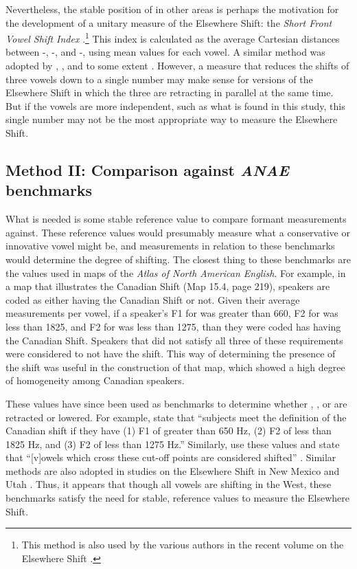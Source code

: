 Nevertheless, the stable position of \fleece in other areas is perhaps the motivation for the development of a unitary measure of the Elsewhere Shift: the \textit{Short Front Vowel Shift Index} \citep{boberg_2019}.\footnote{This method is also used by the various authors in the recent volume on the Elsewhere Shift \citep{becker_2019_pads}.} This index is calculated as the average Cartesian distances between \fleece-\kit, \fleece-\dress, and \fleece-\trap, using mean values for each vowel. A similar method was adopted by \citet{holland_2019}, \citet{pratt_donofrio_2017}, and to some extent \citet{podesva_etal_2015}. However, a measure that reduces the shifts of three vowels down to a single number may make sense for versions of the Elsewhere Shift in which the three are retracting in parallel at the same time. But if the vowels are more independent, such as what is found in this study, this single number may not be the most appropriate way to measure the Elsewhere Shift.


\subsection{Method II: Comparison against \textit{ANAE} benchmarks}

What is needed is some stable reference value to compare formant measurements against. These reference values would presumably measure what a conservative or innovative vowel might be, and measurements in relation to these benchmarks would determine the degree of shifting. The closest thing to these benchmarks are the values used in maps of the \textit{Atlas of North American English}. For example, in a map that illustrates the Canadian Shift (Map 15.4, page 219), speakers are coded as either having the Canadian Shift or not. Given their average measurements per vowel, if a speaker’s F1 for \dress was greater than 660, F2 for \trap was less than 1825, and F2 for \lot was less than 1275, than they were coded has having the Canadian Shift. Speakers that did not satisfy all three of these requirements were considered to not have the shift. This way of determining the presence of the shift was useful in the construction of that map, which showed a high degree of homogeneity among Canadian speakers.

These values have since been used as benchmarks to determine whether \lot, \trap, or \dress are retracted or lowered. For example, \citet[44]{kennedy_grama_2012} state that ``subjects meet the definition of the Canadian shift if they have (1) F1 of \dress greater than 650 Hz, (2) F2 of \trap less than 1825 Hz, and (3) F2 of \lot less than 1275 Hz.'' Similarly, \citeauthor{becker_etal_2016_pads} use these values and state that ``[v]owels which cross these cut-off points are considered shifted'' \citeyearpar[113]{becker_etal_2016_pads}. Similar methods are also adopted in studies on the Elsewhere Shift in New Mexico \citep{brumbaugh_koops_2017_pads} and Utah \citet{bowie_2017_pads}. Thus, it appears that though all vowels are shifting in the West, these benchmarks satisfy the need for stable, reference values to measure the Elsewhere Shift.

